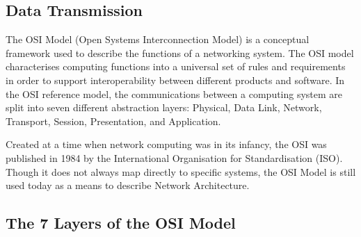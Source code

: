 \documentclass[../report.tex]{subfiles}
\begin{document}






\pagebreak

\subsection{Data Transmission} %

The OSI Model (Open Systems Interconnection Model) is a conceptual framework used to describe the functions of a networking system. The OSI model characterises computing functions into a universal set of rules and requirements in order to support interoperability between different products and software. In the OSI reference model, the communications between a computing system are split into seven different abstraction layers: Physical, Data Link, Network, Transport, Session, Presentation, and Application.

Created at a time when network computing was in its infancy, the OSI was published in 1984 by the International Organisation for Standardisation (ISO). Though it does not always map directly to specific systems, the OSI Model is still used today as a means to describe Network Architecture.

\subsection{The 7 Layers of the OSI Model}
\end{document}
